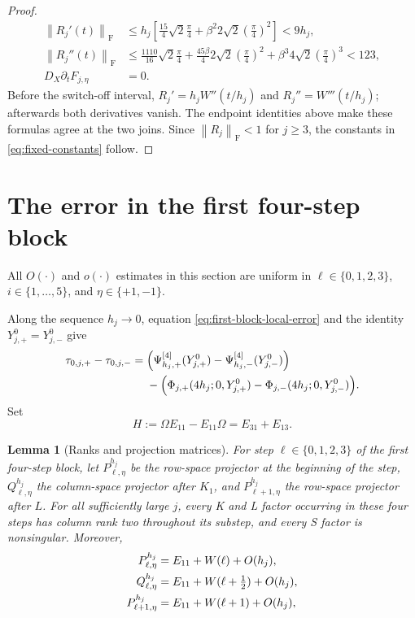 \documentclass[]{article}
\numberwithin{equation}{section}
\theoremstyle{plain}
\newtheorem{lemma}[theorem]{Lemma}
\theoremstyle{remark}
\newcommand{\F}{\mathrm F}
\newcommand{\norm}[1]{\left\lVert #1\right\rVert}
\begin{document}
\begin{proof}
\begin{align*}
 \norm{R_j'(t)}_{\F}
 &\le h_j\left[
 \frac{15}{4}\sqrt2\frac\pi4
 +\beta^2 2\sqrt2\left(\frac\pi4\right)^2\right]
 <9h_j,\\
 \norm{R_j''(t)}_{\F}
 &\le \frac{1110}{16}\sqrt2\frac\pi4
 +\frac{45\beta}{4}2\sqrt2\left(\frac\pi4\right)^2
 +\beta^3 4\sqrt2\left(\frac\pi4\right)^3
 <123,\\
 D_X\partial_tF_{j,\eta}&=0.
\end{align*}
Before the switch-off interval,
$R_j'=h_jW''(t/h_j)$ and $R_j''=W'''(t/h_j)$; afterwards both
derivatives vanish.  The endpoint identities above make these formulas
agree at the two joins.
Since $\norm{R_j}_{\F}<1$ for $j\ge3$, the constants in
\eqref{eq:fixed-constants} follow.
\end{proof}

\section{The error in the first four-step block}
\label{sec:defect}

All $O(\cdot)$ and $o(\cdot)$ estimates in this section are uniform in
$\ell\in\{0,1,2,3\}$, $i\in\{1,\ldots,5\}$, and
$\eta\in\{+1,-1\}$.

Along the sequence $h_j\to0$, equation
\eqref{eq:first-block-local-error} and the identity
$Y^0_{j,+}=Y^0_{j,-}$ give
\begin{equation}\label{eq:tau-difference-decomposition}
\begin{aligned}
 \tau_{0,j,+}-\tau_{0,j,-}
 ={}&\Bigl(\Psi^{[4]}_{h_j,+}(Y_{j,+}^0)
           -\Psi^{[4]}_{h_j,-}(Y_{j,-}^0)\Bigr)\\
 &-\Bigl(\Phi_{j,+}(4h_j;0,Y_{j,+}^0)
          -\Phi_{j,-}(4h_j;0,Y_{j,-}^0)\Bigr).
\end{aligned}
\end{equation}
Set
\begin{equation}\label{eq:H-def}
 H:=\Omega E_{11}-E_{11}\Omega=E_{31}+E_{13}.
\end{equation}

\begin{lemma}[Ranks and projection matrices]
\label{lem:rank-projectors}
For step $\ell\in\{0,1,2,3\}$ of the first four-step block, let
$P^{h_j}_{\ell,\eta}$ be the row-space projector at the beginning of
the step, $Q^{h_j}_{\ell,\eta}$ the column-space projector after
$K_1$, and $P^{h_j}_{\ell+1,\eta}$ the row-space projector after $L$.
For all sufficiently large $j$, every K and L factor occurring in
these four steps has column rank two throughout its substep, and every
S factor is nonsingular.  Moreover,
\begin{align}
 P^{h_j}_{\ell,\eta}
 &=E_{11}+W(\ell)+O(h_j),\notag\\
 Q^{h_j}_{\ell,\eta}
 &=E_{11}+W(\ell+\tfrac12)+O(h_j),\notag\\
 P^{h_j}_{\ell+1,\eta}
 &=E_{11}+W(\ell+1)+O(h_j),
 \label{eq:projector-limits}
\end{align}
\end{lemma}
\end{document}
